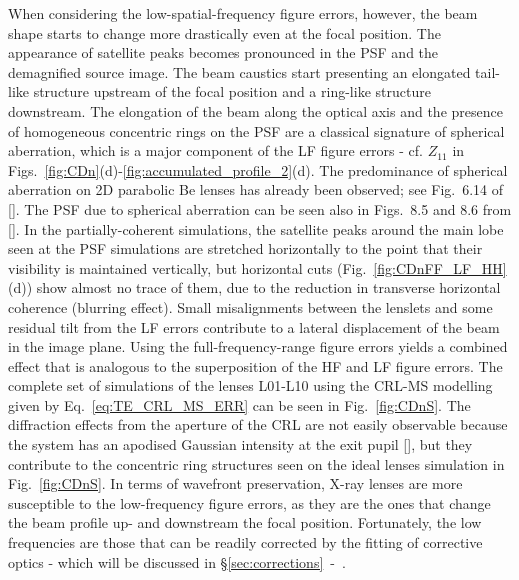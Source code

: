 \begin{refsection}
When considering the low-spatial-frequency figure errors, however, the beam shape starts to change more drastically even at the focal position. The appearance of satellite peaks becomes pronounced in the PSF and the demagnified source image. The beam caustics start presenting an elongated tail-like structure upstream of the focal position and a ring-like structure downstream. The elongation of the beam along the optical axis and the presence of homogeneous concentric rings on the PSF are a classical signature of spherical aberration, which is a major component of the LF figure errors - cf. $Z_{11}$ in Figs.~\ref{fig:CDn}(d)-\ref{fig:accumulated_profile_2}(d). The predominance of spherical aberration on 2D parabolic Be lenses has already been observed; see Fig.~6.14 of [\cite{Seiboth2016b}]. The PSF due to spherical aberration can be seen also in Figs.~8.5 and 8.6 from [\cite{Mahajan2011}]. In the partially-coherent simulations, the satellite peaks around the main lobe seen at the PSF simulations are stretched horizontally to the point that their visibility is maintained vertically, but horizontal cuts (Fig.~\ref{fig:CDnFF_LF_HH}(d)) show almost no trace of them, due to the reduction in transverse horizontal coherence (blurring effect). Small misalignments between the lenslets and some residual tilt from the LF errors contribute to a lateral displacement of the beam in the image plane. Using the full-frequency-range figure errors yields a combined effect that is analogous to the superposition of the HF and LF figure errors. The complete set of simulations of the lenses L01-L10 using the CRL-MS modelling given by Eq.~\ref{eq:TE_CRL_MS_ERR} can be seen in Fig.~\ref{fig:CDnS}. The diffraction effects from the aperture of the CRL are not easily observable because the system has an apodised Gaussian intensity at the exit pupil [\cite{Mahajan1986}], but they contribute to the concentric ring structures seen on the ideal lenses simulation in Fig.~\ref{fig:CDnS}. In terms of wavefront preservation, X-ray lenses are more susceptible to the low-frequency figure errors, as they are the ones that change the beam profile up- and downstream the focal position. Fortunately, the low frequencies are those that can be readily corrected by the fitting of corrective optics - which will be discussed in \S\ref{sec:corrections}~-~\textit{}. 


\end{refsection}
